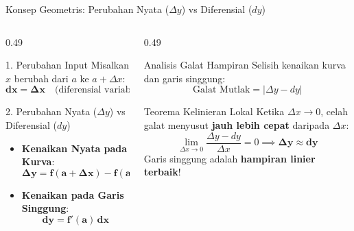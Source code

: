 \documentclass[aspectratio=169,10pt]{beamer}
\begin{document}
\begin{frame}{Konsep Geometris: Perubahan Nyata ($\Delta y$) vs Diferensial ($dy$)}
    \begin{columns}[T]
        \begin{column}{0.49\textwidth}
            \begin{block}{1. Perubahan Input}
                Misalkan $x$ berubah dari $a$ ke $a + \Delta x$:
                \[
                    \mathbf{dx = \Delta x} \quad \text{(diferensial variabel bebas)}
                \]
            \end{block}

            \begin{block}{2. Perubahan Nyata ($\Delta y$) vs Diferensial ($dy$)}
                \begin{itemize}
                    \item \textbf{Kenaikan Nyata pada Kurva}:
                    \[
                        \mathbf{\Delta y = f(a + \Delta x) - f(a)}
                    \]
                    \item \textbf{Kenaikan pada Garis Singgung}:
                    \[
                        \mathbf{dy = f'(a)\,dx}
                    \]
                \end{itemize}
            \end{block}
        \end{column}

        \begin{column}{0.49\textwidth}
            \begin{alertblock}{Analisis Galat Hampiran}
                Selisih kenaikan kurva dan garis singgung:
                \[
                    \text{Galat Mutlak} = |\Delta y - dy|
                \]
            \end{alertblock}

            \begin{exampleblock}{Teorema Kelinieran Lokal}
                Ketika $\Delta x \to 0$, celah galat menyusut \textbf{jauh lebih cepat} daripada $\Delta x$:
                \[
                    \lim_{\Delta x \to 0} \frac{\Delta y - dy}{\Delta x} = 0 \implies \mathbf{\Delta y \approx dy}
                \]
                Garis singgung adalah \textbf{hampiran linier terbaik}!
            \end{exampleblock}
        \end{column}
    \end{columns}
\end{frame}
\end{document}
